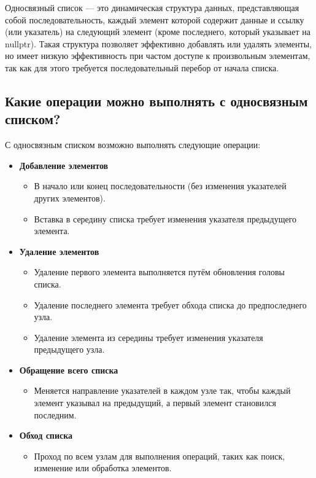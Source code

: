 \documentclass[a4paper,12pt]{article}
\begin{document}
	Односвязный список — это динамическая структура данных, представляющая собой последовательность, каждый элемент которой содержит данные и ссылку (или указатель) на следующий элемент (кроме последнего, который указывает на nullptr). Такая структура позволяет эффективно добавлять или удалять элементы, но имеет низкую эффективность при частом доступе к произвольным элементам, так как для этого требуется последовательный перебор от начала списка.
	
	\subsection{Какие операции можно выполнять с односвязным списком?}
	
	С односвязным списком возможно выполнять следующие операции:  
	
	\begin{itemize}
		\item \textbf{Добавление элементов}  
		\begin{itemize}
			\item В начало или конец последовательности (без изменения указателей других элементов).  
			\item Вставка в середину списка требует изменения указателя предыдущего элемента.  
		\end{itemize}
		
		\item \textbf{Удаление элементов}  
		\begin{itemize}
			\item Удаление первого элемента выполняется путём обновления головы списка.  
			\item Удаление последнего элемента требует обхода списка до предпоследнего узла.  
			\item Удаление элемента из середины требует изменения указателя предыдущего узла.  
		\end{itemize}
		
		\item \textbf{Обращение всего списка}  
		\begin{itemize}
			\item Меняется направление указателей в каждом узле так, чтобы каждый элемент указывал на предыдущий, а первый элемент становился последним.  
		\end{itemize}
		
		\item \textbf{Обход списка}  
		\begin{itemize}
			\item Проход по всем узлам для выполнения операций, таких как поиск, изменение или обработка элементов.  
		\end{itemize}
	\end{itemize}
\end{document}
